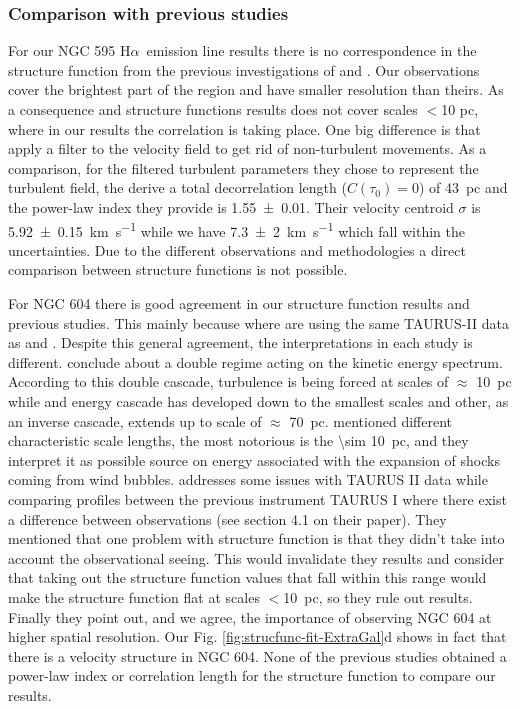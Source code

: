 \documentclass[fleqn,usenatbib, useAMS, a4paper]{mnras}
\newcommand\halpha{H${\alpha}$}
\begin{document}
\subsubsection{Comparison with previous studies}
\label{sec:comparison-m33}
For our NGC 595 \halpha\ emission line results there is no correspondence in the structure function from the previous investigations of \citet{lagrois2009multi} and \citet{lagrois2011}.
Our observations cover the brightest part of the region and have smaller resolution than theirs.
As a consequence \citet{lagrois2009multi} and \citet{lagrois2011} structure functions results does not cover scales $<$10 pc, where in our results the correlation is taking place.
One big difference is that \citet{lagrois2011} apply a  filter to the velocity field to get rid of non-turbulent movements.
As a comparison, for the filtered turbulent parameters they chose to represent the turbulent field, the derive a total  decorrelation length (\(C(\tau_0) = 0\)) of \SI{43}{pc} and the power-law index they provide is \num{1.55 \pm 0.01}.
Their velocity centroid \(\sigma\) is \SI{5.92 \pm 0.15}{km.s^{-1}} while we have \SI{7.3\pm 2}{km. s^{-1}} which fall within the uncertainties.
Due to the different observations and methodologies a direct comparison between structure functions is not possible.

For NGC 604 there is good agreement in our structure function results and previous studies.
This mainly because where are using the same TAURUS-II data as \citet{Melnick:2021x} and \citet{Medina-Tanco:1997a}.
Despite this general agreement, the interpretations in each study is different.
\citet{Medina-Tanco:1997a} conclude about a double regime acting on the kinetic energy spectrum.
According to this double cascade, turbulence is being forced at scales of \(\approx\) \SI{10}{pc} while and energy cascade has developed down to the smallest scales and other, as an inverse cascade, extends up to scale of \(\approx\) \SI{70}{pc}.
\citet{Medina-Tanco:1997a} mentioned different characteristic scale lengths, the most notorious is the \SI{\sim 10}{pc}, and they interpret it as possible source on energy associated with the expansion of shocks coming from wind bubbles.  
\citet{Melnick:2021x} addresses some issues with TAURUS II data while comparing profiles between the previous instrument TAURUS I where there exist a difference between observations (see section 4.1 on their paper).
They mentioned that one problem with \citet{Medina-Tanco:1997a} structure function is that they didn't take into account the observational seeing.
This would invalidate they results and \citet{Melnick:2021x} consider that taking out the structure function values that fall within this range would make the structure function flat at scales \(<\)\SI{10}{pc}, so they rule out \citet{Medina-Tanco:1997a} results.
Finally they point out, and we agree, the importance of observing NGC 604 at higher spatial resolution. 
Our Fig. \ref{fig:strucfunc-fit-ExtraGal}d shows in fact that there is a velocity structure in NGC 604. 
None of the previous studies obtained a power-law index or correlation length for the structure function to compare our results.
\end{document}
